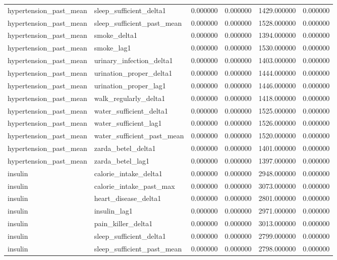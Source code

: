 \begin{longtable}{llrrrr}
hypertension\_past\_mean & sleep\_sufficient\_delta1 & 0.000000 & 0.000000 & 1429.000000 & 0.000000 \\
hypertension\_past\_mean & sleep\_sufficient\_past\_mean & 0.000000 & 0.000000 & 1528.000000 & 0.000000 \\
hypertension\_past\_mean & smoke\_delta1 & 0.000000 & 0.000000 & 1394.000000 & 0.000000 \\
hypertension\_past\_mean & smoke\_lag1 & 0.000000 & 0.000000 & 1530.000000 & 0.000000 \\
hypertension\_past\_mean & urinary\_infection\_delta1 & 0.000000 & 0.000000 & 1403.000000 & 0.000000 \\
hypertension\_past\_mean & urination\_proper\_delta1 & 0.000000 & 0.000000 & 1444.000000 & 0.000000 \\
hypertension\_past\_mean & urination\_proper\_lag1 & 0.000000 & 0.000000 & 1446.000000 & 0.000000 \\
hypertension\_past\_mean & walk\_regularly\_delta1 & 0.000000 & 0.000000 & 1418.000000 & 0.000000 \\
hypertension\_past\_mean & water\_sufficient\_delta1 & 0.000000 & 0.000000 & 1525.000000 & 0.000000 \\
hypertension\_past\_mean & water\_sufficient\_lag1 & 0.000000 & 0.000000 & 1526.000000 & 0.000000 \\
hypertension\_past\_mean & water\_sufficient\_past\_mean & 0.000000 & 0.000000 & 1520.000000 & 0.000000 \\
hypertension\_past\_mean & zarda\_betel\_delta1 & 0.000000 & 0.000000 & 1401.000000 & 0.000000 \\
hypertension\_past\_mean & zarda\_betel\_lag1 & 0.000000 & 0.000000 & 1397.000000 & 0.000000 \\
insulin & calorie\_intake\_delta1 & 0.000000 & 0.000000 & 2948.000000 & 0.000000 \\
insulin & calorie\_intake\_past\_max & 0.000000 & 0.000000 & 3073.000000 & 0.000000 \\
insulin & heart\_disease\_delta1 & 0.000000 & 0.000000 & 2801.000000 & 0.000000 \\
insulin & insulin\_lag1 & 0.000000 & 0.000000 & 2971.000000 & 0.000000 \\
insulin & pain\_killer\_delta1 & 0.000000 & 0.000000 & 3013.000000 & 0.000000 \\
insulin & sleep\_sufficient\_delta1 & 0.000000 & 0.000000 & 2799.000000 & 0.000000 \\
insulin & sleep\_sufficient\_past\_mean & 0.000000 & 0.000000 & 2798.000000 & 0.000000 \\

\end{longtable}
